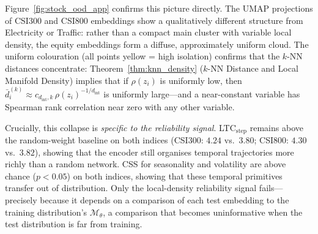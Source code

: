 \documentclass[12pt]{article}
\theoremstyle{definition}
\theoremstyle{remark}
\newcommand{\trm}{\mathcal{M}_\theta}
\newcommand{\dint}{d_{\mathrm{int}}}
\begin{document}
Figure~\ref{fig:stock_ood_app} confirms this picture directly.
The UMAP projections of CSI300 and CSI800 embeddings show a qualitatively
different structure from Electricity or Traffic: rather than a compact main
cluster with variable local density, the equity embeddings form a diffuse,
approximately uniform cloud.
The uniform colouration (all points yellow = high isolation) confirms that
the $k$-NN distances concentrate: Theorem~\ref{thm:knn_density}
($k$-NN Distance and Local Manifold Density) implies that if $\rho(z_i)$ is
uniformly low, then $\bar{d}_i^{(k)} \approx c_{\dint,k}\,\rho(z_i)^{-1/\dint}$
is uniformly large---and a near-constant variable has Spearman rank correlation
near zero with any other variable.

Crucially, this collapse is \emph{specific to the reliability signal}.
LTC$_{\mathrm{step}}$ remains above the random-weight baseline on both indices
(CSI300: $4.24$ vs.\ $3.80$; CSI800: $4.30$ vs.\ $3.82$), showing that the
encoder still organises temporal trajectories more richly than a random network.
CSS for seasonality and volatility are above chance ($p{<}0.05$) on both
indices, showing that these temporal primitives transfer out of distribution.
Only the local-density reliability signal fails---precisely because it depends
on a comparison of each test embedding to the training distribution's $\trm$,
a comparison that becomes uninformative when the test distribution is far from
training.

\end{document}
